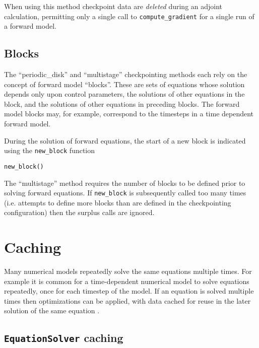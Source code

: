 \documentclass[11pt]{article}
\begin{document}
When using this method checkpoint data are \emph{deleted} during an adjoint
calculation, permitting only a single call to \texttt{compute\_gradient} for a
single run of a forward model.

\subsection{Blocks}\label{sect:blocks}

The ``periodic\_disk'' and ``multistage'' checkpointing methods each rely on
the concept of forward model ``blocks''. These are sets of equations whose
solution depends only upon control parameters, the solutions of other equations
in the block, and the solutions of other equations in preceding blocks. The
forward model blocks may, for example, correspond to the timesteps in a time
dependent forward model.

During the solution of forward equations, the start of a new block is indicated
using the \texttt{new\_block} function
\begin{lstlisting}
new_block()
\end{lstlisting}

The ``multistage'' method requires the number of blocks to be defined prior to
solving forward equations. If \texttt{new\_block} is subsequently called too
many times (i.e. attempts to define more blocks than are defined in the
checkpointing configuration) then the surplus calls are ignored.

\section{Caching}\label{sect:caching}

Many numerical models repeatedly solve the same equations multiple times. For
example it is common for a time-dependent numerical model to solve equations
repeatedly, once for each timestep of the model. If an equation is solved
multiple times then optimizations can be applied, with data cached for reuse in
the later solution of the same equation \citep{maddison2014}.

\subsection{\texttt{EquationSolver} caching}\label{sect:EquationSolver_caching}
\end{document}

